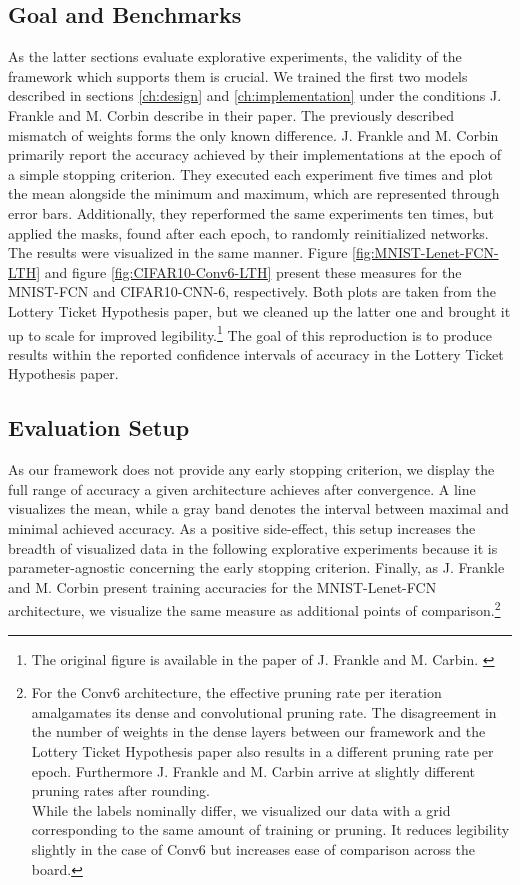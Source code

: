 \subsection*{Goal and Benchmarks}
As the latter sections evaluate explorative experiments, the validity of the framework which supports them is crucial. We trained the first two models described in sections \ref{ch:design} and \ref{ch:implementation} under the conditions J. Frankle and M. Corbin describe in their paper. The previously described mismatch of weights forms the only known difference.
J. Frankle and M. Corbin primarily report the accuracy achieved by their implementations at the epoch of a simple stopping criterion. They executed each experiment five times and plot the mean alongside the minimum and maximum, which are represented through error bars. Additionally, they reperformed the same experiments ten times, but applied the masks, found after each epoch, to randomly reinitialized networks. The results were visualized in the same manner. \cite{LTH}
Figure \ref{fig:MNIST-Lenet-FCN-LTH} and figure \ref{fig:CIFAR10-Conv6-LTH} present these measures for the MNIST-FCN and CIFAR10-CNN-6, respectively. Both plots are taken from the Lottery Ticket Hypothesis paper, but we cleaned up the latter one and brought it up to scale for improved legibility.\footnote{The original figure is available in the paper of J. Frankle and M. Carbin. \cite{LTH}}  The goal of this reproduction is to produce results within the reported confidence intervals of accuracy in the Lottery Ticket Hypothesis paper.  

\subsection*{Evaluation Setup}
As our framework does not provide any early stopping criterion, we display the full range of accuracy a given architecture achieves after convergence. A line visualizes the mean, while a gray band denotes the interval between maximal and minimal achieved accuracy. As a positive side-effect, this setup increases the breadth of visualized data in the following explorative experiments because it is parameter-agnostic concerning the early stopping criterion. Finally,  as J. Frankle and M. Corbin present training accuracies for the MNIST-Lenet-FCN architecture, we visualize the same measure as additional points of comparison.\footnote{For the Conv6 architecture, the effective pruning rate per iteration amalgamates its dense and convolutional pruning rate. The disagreement in the number of weights in the dense layers between our framework and the Lottery Ticket Hypothesis paper also results in a different pruning rate per epoch. Furthermore J. Frankle and M. Carbin arrive at slightly different pruning rates after rounding.\\ While the labels nominally differ, we visualized our data with a grid corresponding to the same amount of training or pruning. It reduces legibility slightly in the case of Conv6 but increases ease of comparison across the board.
} 
